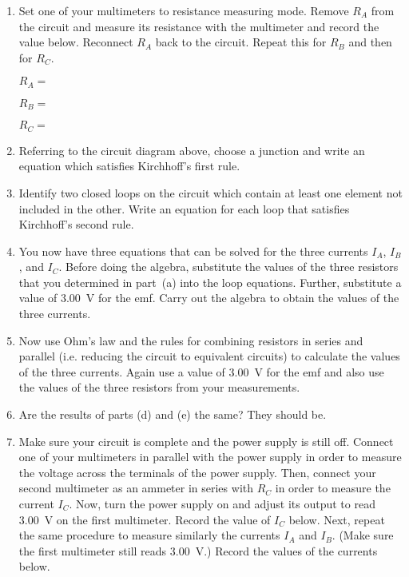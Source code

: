 \begin{enumerate}[labparts]

\item Set one of your multimeters to resistance measuring mode. Remove $R_A$ from the circuit and measure its resistance with the multimeter and record the value below. Reconnect $R_A$ back to the circuit. Repeat this for $R_B$ and then for $R_C$.

\hspace{0.5in}$R_A=$

\hspace{0.5in}$R_B=$

\hspace{0.5in}$R_C=$


\item Referring to the circuit diagram above, choose a junction and write an equation
which satisfies Kirchhoff's first rule.
\answerspace{20mm}

\item Identify two closed loops on the circuit which contain at least one
element not included in the other. Write an equation for each loop
that satisfies Kirchhoff's second rule.
\answerspace{30mm}

\item You now have three equations that can be solved for the three currents $I_A$, $I_B$, and $I_C$.
Before doing the algebra, substitute the values of the three resistors that you determined in part~(a) into the loop equations. Further, substitute a value of 3.00~V for the emf. Carry out the algebra to obtain the values of the three currents.
\answerspace{5in}

\item Now use Ohm's law and the rules for combining resistors in series and parallel (i.e. reducing the circuit to equivalent circuits) to calculate the values of the three currents. Again use a value of 3.00~V for the emf and also use the values of the three resistors from your measurements.
\answerspace{3.5in}

\item Are the results of parts (d) and (e) the same? They should be.
\answerspace{15mm}

\item Make sure your circuit is complete and the power supply is still off. Connect one of your multimeters in parallel with the power supply in order to measure the voltage across the terminals of the power supply. Then, connect your second multimeter as an ammeter in series with $R_C$ in order to measure the current $I_C$. Now, turn the power supply on and adjust its output to read 3.00~V on the first multimeter. Record the value of $I_C$ below. Next, repeat the same procedure to measure similarly the currents $I_A$ and $I_B$. (Make sure the first multimeter still reads 3.00~V.) Record the values of the currents below.


\end{enumerate}
